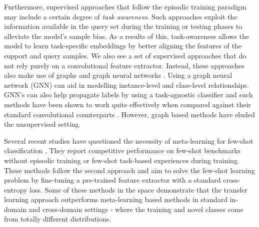 Furthermore, supervised approaches that follow the episodic training paradigm may include a certain degree of \textit{task awareness}.
Such approaches exploit the information available in the query set during the training or testing phases \parencite{bateni2022enhancing, ye2020few, Cui2021} to alleviate the model's sample bias. As a results of this, task-awareness allows the model to learn task-specific embeddings by better aligning the features of the support and query samples.
We also see a set of supervised approaches that do not rely purely on a convolutional feature extractor. Instead, these approaches also make use of graphs and graph neural networks \parencite{garcia2018fewshot, kim2019edge, yu2022hybrid, yang2020dpgn}. Using a graph neural network (GNN) can aid in modelling instance-level and class-level relationships. GNN's can also help propagate labels by using a task-agnostic classifier and such methods have been shown to work quite effectively when compared against their standard convolutional counterparts \parencite{kim2019edge, garcia2018fewshot, yu2022hybrid, yang2020dpgn}. However, graph based methods have eluded the unsupervised setting.

Several recent studies have questioned the necessity of meta-learning for few-shot classification \parencite{goodemballneed2020, Medina2020Self-SupervisedClassification, dhillon2019baseline, ziko2020laplacian, boudiaf2020information,chen2021self, shirekar2022self}. They report competitive performance on few-shot benchmarks without episodic training or few-shot task-based experiences during training. These methods follow the second approach and aim to solve the few-shot learning problem by fine-tuning a pre-trained feature extractor with a standard cross-entropy loss.
Some of these methods \parencite{Medina2020Self-SupervisedClassification, goodemballneed2020, das2022confess} in the space demonstrate that the transfer learning approach outperforms meta-learning based methods in standard in-domain and cross-domain settings - where the training and novel classes come from totally different distributions.